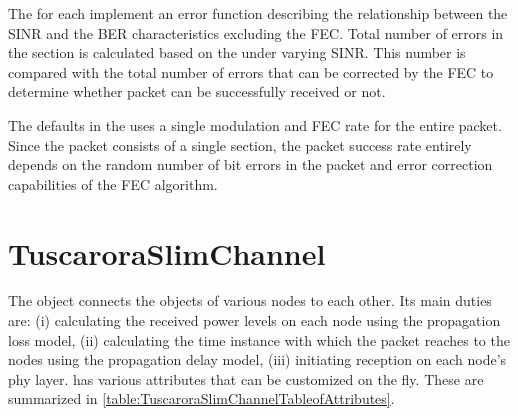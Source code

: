The  for each  implement an error function describing the relationship between the SINR and the BER characteristics excluding the FEC. Total number of errors in the section is calculated based on the  under varying SINR. This number is compared with the total number of errors that can be corrected by the FEC to determine whether packet can be successfully received or not. 

The defaults in the  uses a single modulation and FEC rate for the entire packet. Since the packet consists of a single section, the packet success rate entirely depends on the random number of bit errors in the packet and error correction capabilities of the FEC algorithm. 

\section{TuscaroraSlimChannel}

The  object connects the  objects of various nodes to each other. Its main duties are: (i) calculating the received power levels on each node using the propagation loss model, (ii) calculating the time instance with which the packet reaches to the nodes using the propagation delay model, (iii) initiating reception on each node's phy layer. 
 has various attributes that can be customized on the fly. These are summarized in \cref{table:TuscaroraSlimChannelTableofAttributes}.



 